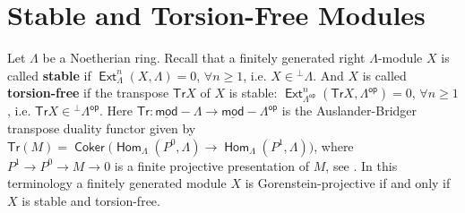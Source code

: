 \documentclass[oneside, a4paper,reqno]{amsart}
\numberwithin{equation}{section}
\theoremstyle{definition}
\begin{document}
\section{Stable and Torsion-Free Modules} Let $\Lambda$ be a
Noetherian ring. Recall that a finitely generated right
$\Lambda$-module $X$ is called {\bf stable} if
$\operatorname*{\mathsf{Ext}}^{n}_{\Lambda}(X,\Lambda) = 0$, $\forall n \geq 1$, i.e. $X \in
{^{\bot}}\Lambda$. And $X$ is called {\bf torsion-free} if the
transpose $\mathsf{Tr}X$ of $X$ is stable:
$\operatorname*{\mathsf{Ext}}^{n}_{\Lambda^\operatorname*{\mathsf{op}}}(\mathsf{Tr} X,\Lambda^\operatorname*{\mathsf{op}}) = 0$,
$\forall n \geq 1$, i.e. $\mathsf{Tr}X \in {^{\bot}}\Lambda^\operatorname*{\mathsf{op}}$.
Here $\mathsf{Tr} \colon \operatorname*{\underline{\mathsf{mod}}-\!}\Lambda {\longrightarrow} \operatorname*{\underline{\mathsf{mod}}-\!}\Lambda^\operatorname*{\mathsf{op}}$ is
the Auslander-Bridger transpose duality functor given by
$\mathsf{Tr}(M) = \operatorname*{\mathsf{Coker}}\big(\operatorname{\mathsf{Hom}}_{\Lambda}(P^{0},\Lambda) {\longrightarrow}
\operatorname{\mathsf{Hom}}_{\Lambda}(P^{1},\Lambda)\big)$, where $P^{1} {\longrightarrow} P^{0} {\longrightarrow} M
{\longrightarrow} 0$ is a finite projective presentation of $M$, see \cite{ABr}.
In this terminology a finitely generated module $X$ is
Gorenstein-projective if and only if $X$ is stable and torsion-free.
\end{document}
